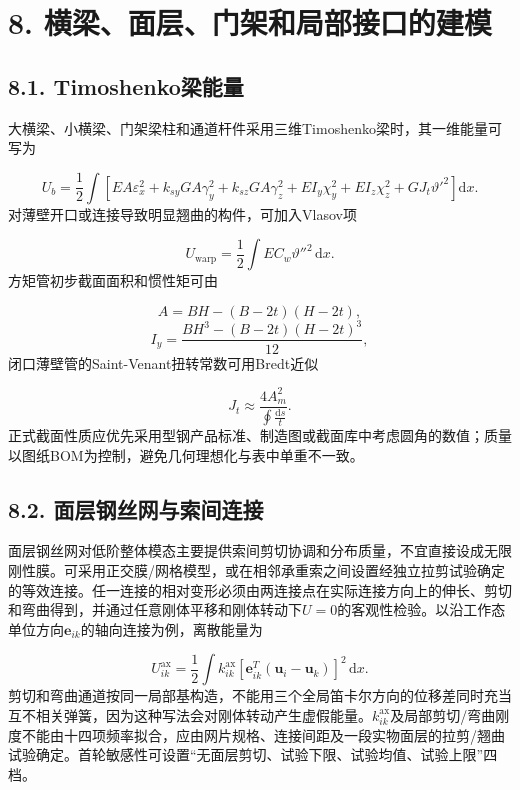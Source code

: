 \documentclass[UTF8,a4paper,11pt,fontset=none]{ctexart}
\begin{document}
\section*{8. 横梁、面层、门架和局部接口的建模}
\subsection*{8.1. Timoshenko梁能量}
大横梁、小横梁、门架梁柱和通道杆件采用三维Timoshenko梁时，其一维能量可写为\par
\[
U_b=\frac12\int
\left[
EA\varepsilon_x^2
+k_{sy}GA\gamma_y^2
+k_{sz}GA\gamma_z^2
+EI_y\chi_y^2
+EI_z\chi_z^2
+GJ_t\vartheta'^2
\right]\mathrm dx.
\]
对薄壁开口或连接导致明显翘曲的构件，可加入Vlasov项\par
\[
U_{\mathrm{warp}}=\frac12\int EC_w\vartheta''^2\,\mathrm dx.
\]
方矩管初步截面面积和惯性矩可由\par
\[
A=BH-(B-2t)(H-2t),
\]
\[
I_y=\frac{BH^3-(B-2t)(H-2t)^3}{12},
\]
闭口薄壁管的Saint-Venant扭转常数可用Bredt近似\par
\[
J_t\approx\frac{4A_m^2}{\displaystyle\oint\frac{\mathrm ds}{t}}.
\]
正式截面性质应优先采用型钢产品标准、制造图或截面库中考虑圆角的数值；质量以图纸BOM为控制，避免几何理想化与表中单重不一致。\par
{}
\subsection*{8.2. 面层钢丝网与索间连接}
面层钢丝网对低阶整体模态主要提供索间剪切协调和分布质量，不宜直接设成无限刚性膜。可采用正交膜/网格模型，或在相邻承重索之间设置经独立拉剪试验确定的等效连接。任一连接的相对变形必须由两连接点在实际连接方向上的伸长、剪切和弯曲得到，并通过任意刚体平移和刚体转动下\(U=0\)\allowbreak{}的客观性检验。以沿工作态单位方向\(\mathbf e_{ik}\)\allowbreak{}的轴向连接为例，离散能量为\par
\[
U_{ik}^{\mathrm{ax}}
=\frac12\int k_{ik}^{\mathrm{ax}}
\left[\mathbf e_{ik}^{T}
(\mathbf u_i-\mathbf u_k)\right]^2\,\mathrm dx.
\]
剪切和弯曲通道按同一局部基构造，不能用三个全局笛卡尔方向的位移差同时充当互不相关弹簧，因为这种写法会对刚体转动产生虚假能量。\(k_{ik}^{\mathrm{ax}}\)\allowbreak{}及局部剪切/弯曲刚度不能由十四项频率拟合，应由网片规格、连接间距及一段实物面层的拉剪/翘曲试验确定。首轮敏感性可设置“无面层剪切、试验下限、试验均值、试验上限”四档。\par
{}
\end{document}
